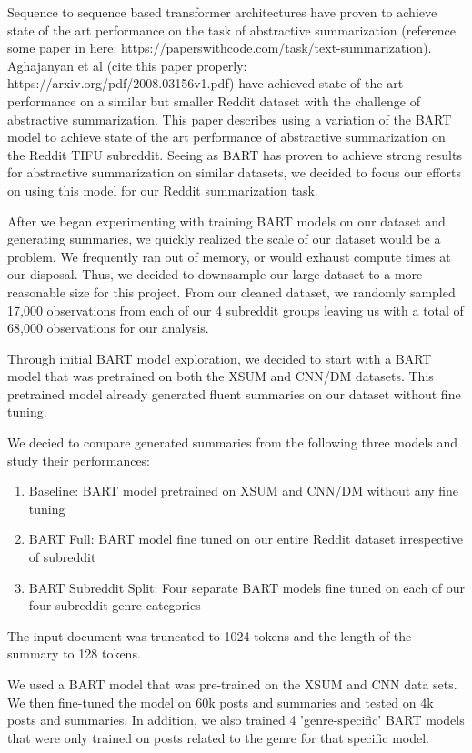 \documentclass[11pt,a4paper, twocolumn]{article}
\begin{document}
Sequence to sequence based transformer architectures have proven to achieve state of the art performance on the task of abstractive summarization (reference some paper in here: https://paperswithcode.com/task/text-summarization). 
Aghajanyan et al (cite this paper properly: https://arxiv.org/pdf/2008.03156v1.pdf) have achieved state of the art performance on a similar but smaller Reddit dataset with the challenge of abstractive summarization. 
This paper describes using a variation of the BART model to achieve state of the art performance of abstractive summarization on the Reddit TIFU subreddit. 
Seeing as BART has proven to achieve strong results for abstractive summarization on similar datasets, we decided to focus our efforts on using this model for our Reddit summarization task. 

After we began experimenting with training BART models on our dataset and generating summaries, we quickly realized the scale of our dataset would be a problem. 
We frequently ran out of memory, or would exhaust compute times at our disposal. 
Thus, we decided to downsample our large dataset to a more reasonable size for this project. 
From our cleaned dataset, we randomly sampled 17,000 observations from each of our 4 subreddit groups leaving us with a total of 68,000 observations for our analysis. 

Through initial BART model exploration, we decided to start with a BART model that was pretrained on both the XSUM and CNN/DM datasets. 
This pretrained model already generated fluent summaries on our dataset without fine tuning. 

We decied to compare generated summaries from the following three models and study their performances:
\begin{enumerate}
  \item Baseline: BART model pretrained on XSUM and CNN/DM without any fine tuning
  \item BART Full: BART model fine tuned on our entire Reddit dataset irrespective of subreddit
  \item BART Subreddit Split: Four separate BART models fine tuned on each of our four subreddit genre categories
\end{enumerate}


The input document was truncated to 1024 tokens and the length of the summary to 128 tokens. 

We used a BART model that was pre-trained on the XSUM and CNN data sets. We then fine-tuned the model on 60k posts and summaries and tested on 4k posts and summaries. In addition, we also trained 4 'genre-specific' BART models that were only trained on posts related to the genre for that specific model. 
\end{document}
